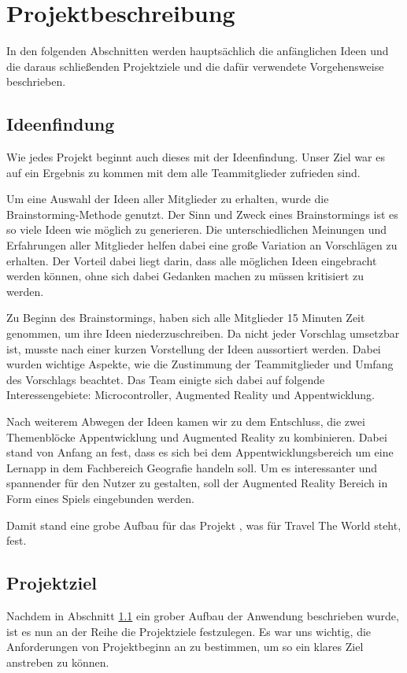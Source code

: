 \chapter{Projektbeschreibung}\label{ch:projektbeschreibung}
In den folgenden Abschnitten werden hauptsächlich die anfänglichen Ideen und die daraus schließenden Projektziele und die dafür verwendete Vorgehensweise beschrieben.

\section{Ideenfindung}\label{ideenfindung}
Wie jedes Projekt beginnt auch dieses mit der Ideenfindung. Unser Ziel war es auf ein Ergebnis zu kommen mit dem alle Teammitglieder zufrieden sind.

Um eine Auswahl der Ideen aller Mitglieder zu erhalten, wurde die Brainstorming-Methode genutzt. Der Sinn und Zweck eines Brainstormings ist es so viele Ideen wie möglich zu generieren. Die unterschiedlichen Meinungen und Erfahrungen aller Mitglieder helfen dabei eine große Variation an Vorschlägen zu erhalten. Der Vorteil dabei liegt darin, dass alle möglichen Ideen eingebracht werden können, ohne sich dabei Gedanken machen zu müssen kritisiert zu werden.

Zu Beginn des Brainstormings, haben sich alle Mitglieder 15 Minuten Zeit genommen, um ihre Ideen niederzuschreiben. Da nicht jeder Vorschlag umsetzbar ist, musste nach einer kurzen Vorstellung der Ideen aussortiert werden. Dabei wurden wichtige Aspekte, wie die Zustimmung der Teammitglieder und Umfang des Vorschlags beachtet. Das Team einigte sich dabei auf folgende Interessengebiete: Microcontroller, Augmented Reality und Appentwicklung.

Nach weiterem Abwegen der Ideen kamen wir zu dem Entschluss, die zwei Themenblöcke Appentwicklung und Augmented Reality zu kombinieren. Dabei stand von Anfang an fest, dass es sich bei dem Appentwicklungsbereich um eine Lernapp in dem Fachbereich Geografie handeln soll. Um es interessanter und spannender für den Nutzer zu gestalten, soll der Augmented Reality Bereich in Form eines Spiels eingebunden werden. 

Damit stand eine grobe Aufbau für das Projekt  , was für Travel The World steht, fest.

\section{Projektziel}\label{projektziel}
Nachdem in Abschnitt \ref{ideenfindung} ein grober Aufbau der Anwendung beschrieben wurde, ist es nun an der Reihe die Projektziele festzulegen. Es war uns wichtig, die Anforderungen von Projektbeginn an zu bestimmen, um so ein klares Ziel anstreben zu können.

